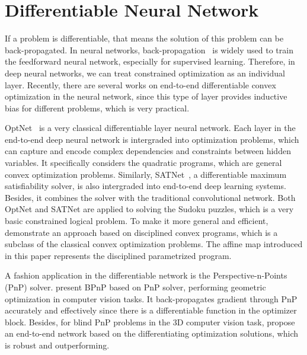 \section{Differentiable Neural Network}
\label{sec:differentiable}
If a problem is differentiable, that means the solution of this problem can be back-propagated. In neural networks, back-propagation~\citep{GI:16} is widely used to train the feedforward neural network, especially for supervised learning. Therefore, in deep neural networks, we can treat constrained optimization as an individual layer. Recently, there are several works on end-to-end differentiable convex optimization in the neural network, since this type of layer provides inductive bias for different problems, which is very practical. 
\par OptNet~\citep{AB:17} is a very classical differentiable layer neural network. Each layer in the end-to-end deep neural network is intergraded into optimization problems, which can capture and encode complex dependencies and constraints between hidden variables. It specifically considers the quadratic programs, which are general convex optimization problems. Similarly, SATNet~\citep{WP:19}, a differentiable maximum satisfiability solver, is also intergraded into end-to-end deep learning systems. Besides, it combines the solver with the traditional convolutional network. Both OptNet and SATNet are applied to solving the Sudoku puzzles, which is a very basic constrained logical problem. To make it more general and efficient, \cite{AA:19} demonstrate an approach based on disciplined convex programs, which is a subclass of the classical convex optimization problems. The affine map introduced in this paper represents the disciplined parametrized program. 
\par A fashion application in the differentiable network is the Perspective-n-Points (PnP) solver. \cite{CB:20} present BPnP based on PnP solver, performing geometric optimization in computer vision tasks. It back-propagates gradient through PnP accurately and effectively since there is a differentiable function in the optimizer block. Besides, for blind PnP problems in the 3D computer vision task, \cite{CD:20} propose an end-to-end network based on the differentiating optimization solutions, which is robust and outperforming.  
